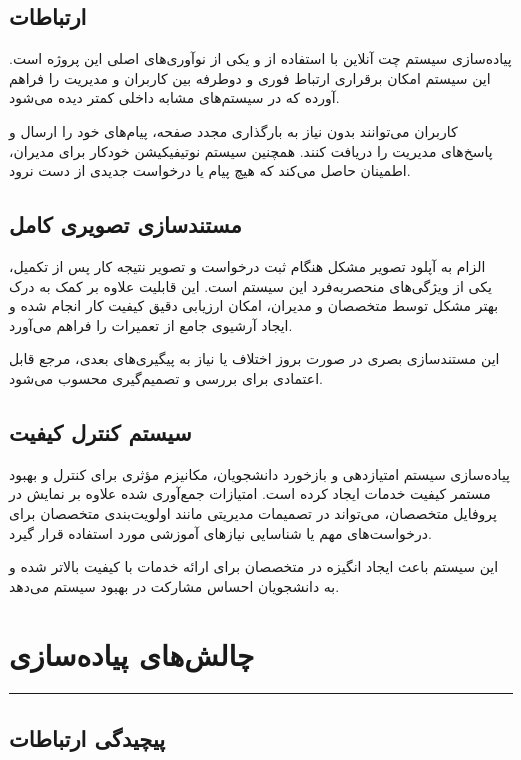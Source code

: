 \documentclass[12pt,a4paper]{report}
\begin{document}
	\subsection{ارتباطات }
	
	پیاده‌سازی سیستم چت آنلاین با استفاده از  و  یکی از نوآوری‌های اصلی این پروژه است. این سیستم امکان برقراری ارتباط فوری و دوطرفه بین کاربران و مدیریت را فراهم آورده که در سیستم‌های مشابه داخلی کمتر دیده می‌شود.
	
	کاربران می‌توانند بدون نیاز به بارگذاری مجدد صفحه، پیام‌های خود را ارسال و پاسخ‌های مدیریت را دریافت کنند. همچنین سیستم نوتیفیکیشن خودکار برای مدیران، اطمینان حاصل می‌کند که هیچ پیام یا درخواست جدیدی از دست نرود.
	
	\subsection{مستندسازی تصویری کامل}
	
	الزام به آپلود تصویر مشکل هنگام ثبت درخواست و تصویر نتیجه کار پس از تکمیل، یکی از ویژگی‌های منحصربه‌فرد این سیستم است. این قابلیت علاوه بر کمک به درک بهتر مشکل توسط متخصصان و مدیران، امکان ارزیابی دقیق کیفیت کار انجام شده و ایجاد آرشیوی جامع از تعمیرات را فراهم می‌آورد.
	
	این مستندسازی بصری در صورت بروز اختلاف یا نیاز به پیگیری‌های بعدی، مرجع قابل اعتمادی برای بررسی و تصمیم‌گیری محسوب می‌شود.
	
	\subsection{سیستم کنترل کیفیت}
	
	پیاده‌سازی سیستم امتیازدهی و بازخورد دانشجویان، مکانیزم مؤثری برای کنترل و بهبود مستمر کیفیت خدمات ایجاد کرده است. امتیازات جمع‌آوری شده علاوه بر نمایش در پروفایل متخصصان، می‌تواند در تصمیمات مدیریتی مانند اولویت‌بندی متخصصان برای درخواست‌های مهم یا شناسایی نیازهای آموزشی مورد استفاده قرار گیرد.
	
	این سیستم باعث ایجاد انگیزه در متخصصان برای ارائه خدمات با کیفیت بالاتر شده و به دانشجویان احساس مشارکت در بهبود سیستم می‌دهد.
	
	\newpage
	\section{چالش‌های پیاده‌سازی}
	\noindent\rule{\textwidth}{0.4pt}
	
	\subsection{پیچیدگی ارتباطات }
	
\end{document}
